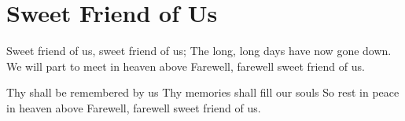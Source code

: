 \starttocol
\chapter{Sweet Friend of Us}
\nexttocol
\hfill{\it }
\stoptocol
\starttocol
\startlines
{\sc Sweet} friend of us, sweet friend of us;
The long, long days have now gone down.
We will part to meet in heaven above
Farewell, farewell sweet friend of us.

Thy shall be remembered by us
Thy memories shall fill our souls
So rest in peace in heaven above
Farewell, farewell sweet friend of us.

\stoplines
\nexttocol

\stoptocol
